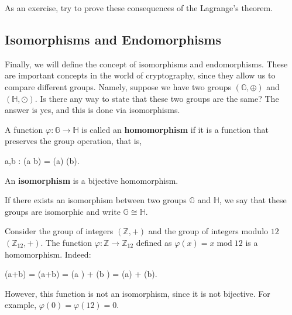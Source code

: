 \documentclass[../lecture-notes-148x210.tex]{subfiles}
\begin{document}
As an exercise, try to prove these consequences of the Lagrange's theorem.



\subsection{Isomorphisms and Endomorphisms}

Finally, we will define the concept of isomorphisms and endomorphisms. These are important concepts in the world of cryptography, since they allow us to compare different groups. Namely, 
suppose we have two groups $(\mathbb{G},\oplus)$ and $(\mathbb{H}, \odot)$. Is there any way to state that these two groups are the same? The answer is yes, and this is done via isomorphisms.

\begin{definition}
    A function $\varphi: \mathbb{G} \to \mathbb{H}$ is called an \textbf{homomorphism} if it is a function that preserves the group operation, that is, 
    \begin{xequation}
        \forall a,b \in {}: \varphi(a \oplus b) = \varphi(a) \odot \varphi(b).
    \end{xequation}
\end{definition}

\begin{definition}
    An \textbf{isomorphism} is a bijective homomorphism.
\end{definition}

\begin{definition}
    If there exists an isomorphism between two groups $\mathbb{G}$ and $\mathbb{H}$, we say that these groups are isomorphic and write $\mathbb{G} \cong \mathbb{H}$.
\end{definition}

\begin{example}
    Consider the group of integers $(\mathbb{Z},+)$ and the group of integers modulo $12$ $(\mathbb{Z}_{12},+)$. The function $\varphi: \mathbb{Z} \to \mathbb{Z}_{12}$ defined as $\varphi(x) = x \;\text{mod}\; 12$ is a homomorphism. Indeed:
    \begin{xequation}
        \varphi(a+b) = (a+b) \; = (a \;) + (b \;) = \varphi(a) + \varphi(b).
    \end{xequation}

    However, this function is not an isomorphism, since it is not bijective. For example, $\varphi(0) = \varphi(12) = 0$.
\end{example}
\end{document}
